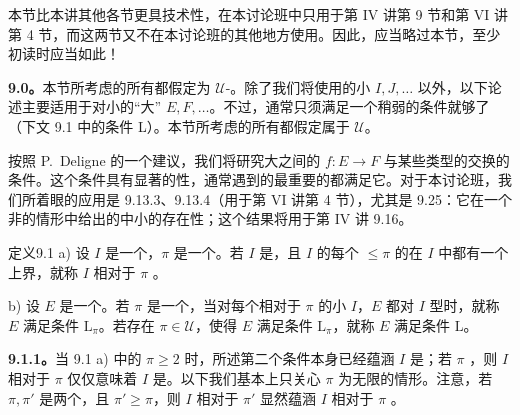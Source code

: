 本节比本讲其他各节更具技术性，在本讨论班中只用于第 IV 讲第 9 节和第 VI 讲第 4 节，而这两节又不在本讨论班的其他地方使用。因此，应当略过本节，至少初读时应当如此！

\textbf{9.0。}本节所考虑的所有都假定为 $\mathcal U$-。除了我们将使用的小 $I,J,\ldots$ 以外，以下论述主要适用于对小的“大” $E,F,\ldots$。不过，通常只须满足一个稍弱的条件就够了（下文 9.1 中的条件 L）。本节所考虑的所有都假定属于 $\mathcal U$。

按照 P.~Deligne 的一个建议，我们将研究大之间的 $f:E\to F$ 与某些类型的交换的条件。这个条件具有显著的性，通常遇到的最重要的都满足它。对于本讨论班，我们所着眼的应用是 9.13.3、9.13.4（用于第 VI 讲第 4 节），尤其是 9.25：它在一个非的情形中给出的中小的存在性；这个结果将用于第 IV 讲 9.16。

\begin{SGAresult}{定义}{9.1}
a) 设 $I$ 是一个，$\pi$ 是一个。若 $I$ 是，且 $I$ 的每个 $\leq\pi$ 的在 $I$ 中都有一个上界，就称 $I$ 相对于 $\pi$ 。

b) 设 $E$ 是一个。若 $\pi$ 是一个，当对每个相对于 $\pi$  的小 $I$，$E$ 都对 $I$ 型时，就称 $E$ 满足条件 $\mathrm L_\pi$。若存在 $\pi\in\mathcal U$，使得 $E$ 满足条件 $\mathrm L_\pi$，就称 $E$ 满足条件 $\mathrm L$。
\end{SGAresult}

\textbf{9.1.1。}当 9.1 a) 中的 $\pi\geq2$ 时，所述第二个条件本身已经蕴涵 $I$ 是；若 $\pi$ ，则 $I$ 相对于 $\pi$  仅仅意味着 $I$ 是。以下我们基本上只关心 $\pi$ 为无限的情形。注意，若 $\pi,\pi'$ 是两个，且 $\pi'\geq\pi$，则 $I$ 相对于 $\pi'$  显然蕴涵 $I$ 相对于 $\pi$ 。

